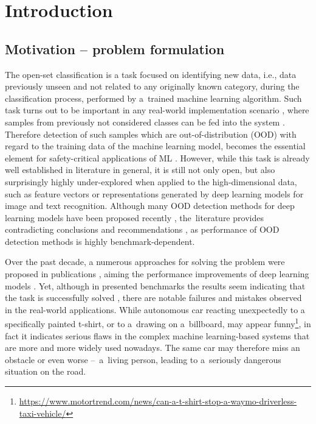 \chapter{Introduction}
\label{chapter:introduction}


\section{Motivation – problem formulation}
\label{section:motivation}

The open-set classification is a task focused on identifying new data, i.e., data previously unseen and not related to any originally known category, during the classification process, performed by a~trained machine learning algorithm. Such task turns out to be important in any real-world implementation scenario \cite{Amodei-2016}, where samples from previously not considered classes can be fed into the system \cite{Hendrycks-2021}. Therefore detection of such samples which are out-of-distribution (OOD) with regard to the training data of the machine learning model, becomes the essential element for safety-critical applications of ML \cite{Hendrycks-2022}. However, while this task is already well established in literature \cite{Hodge-2004}\cite{Chandola-2009} in general, it is still not only open, but also surprisingly highly under-explored when applied to the high-dimensional data, such as feature vectors or representations generated by deep learning models for image and text recognition. Although many OOD detection methods for deep learning models have been proposed recently \cite{Geng-2021}, the~literature provides contradicting conclusions and recommendations \cite{Tajwar-2021}\cite{Yang-2022}, as performance of OOD detection methods is highly benchmark-dependent.

Over the past decade, a numerous approaches for solving the problem were proposed in publications \cite{Lee-2018}\cite{Hendrycks-2022-scaling}, aiming the performance improvements of deep learning models \cite{Wang-2022}\cite{Sun-2022}. Yet, although in presented benchmarks the results seem indicating that the task is successfully solved \cite{Yang-2022}, there are notable failures and mistakes observed in the real-world applications. While autonomous car reacting unexpectedly to a specifically painted t-shirt, or to a~drawing on a~billboard, may appear funny\footnote{\scriptsize\url{https://www.motortrend.com/news/can-a-t-shirt-stop-a-waymo-driverless-taxi-vehicle/}}, in fact it indicates serious flaws in the complex machine learning-based systems that are more and more widely used nowadays. The same car may therefore miss an obstacle or even worse –~a~living person, leading to a~seriously dangerous situation on the road.

